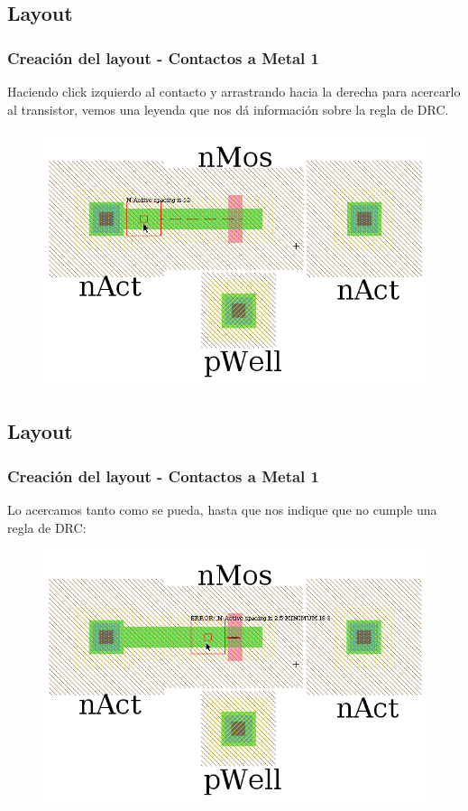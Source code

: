 \documentclass{beamer}
\begin{document}
\begin{frame}
\subsection{Layout}
\frametitle{Creación del layout - Contactos a Metal 1}
Haciendo click izquierdo al contacto y arrastrando hacia la derecha para acercarlo al transistor, vemos una leyenda que nos dá información sobre la regla de DRC.
\begin{figure}
  \includegraphics[width=0.89\linewidth]{figuras/edicionElectric-8.png}
\end{figure}

\end{frame}
\begin{frame}
\subsection{Layout}
\frametitle{Creación del layout - Contactos a Metal 1}
Lo acercamos tanto como se pueda, hasta que nos indique que no cumple una regla de DRC:
\begin{figure}
  \includegraphics[width=0.89\linewidth]{figuras/edicionElectric-8bb.png}
\end{figure}
\end{frame}
\end{document}
